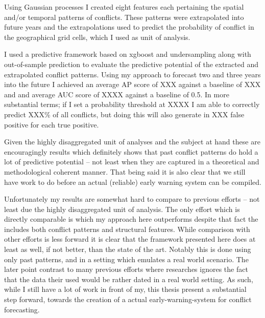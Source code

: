 \documentclass[a4paper]{article}
\begin{document}
Using Gaussian processes I created eight features each pertaining the spatial and/or temporal patterns of conflicts. These patterns were extrapolated into future years and the extrapolations used to predict the probability of conflict in the geographical grid cells, which I used as unit of analysis.\par

I used a predictive framework based on xgboost and undersampling along with out-of-sample prediction to evaluate the predictive potential of the extracted and extrapolated conflict patterns. Using my approach to forecast two and three years into the future I achieved an average AP score of XXX against a baseline of XXX and and average AUC score of XXXX against a baseline of 0.5. In more substantial terms; if I set a probability threshold at XXXX I am able to correctly predict XXX\% of all conflicts, but doing this will also generate in XXX false positive for each true positive.\par 

Given the highly disaggregated unit of analyses and the subject at hand these are encouragingly results which definitely shows that past conflict patterns do hold a lot of predictive potential -- not least when they are captured in a theoretical and methodological coherent manner. That being said it is also clear that we still have work to do before an actual (reliable) early warning system can be compiled.\par 

Unfortunately my results are somewhat hard to compare to previous efforts -- not least due the highly disaggregated unit of analysis. The only effort which is directly comparable is \cite{Maase} which my approach here outperforms despite that fact the \cite{Maase} includes both conflict patterns and structural features. While comparison with other efforts is less forward it is clear that the framework presented here does at least as well, if not better, than the state of the art. Notably this is done using only past patterns, and in a setting which emulates a real world scenario. The later point contrast to many previous efforts where researches ignores the fact that the data their used would be rather dated in a real world setting. As such, while I still have a lot of work in front of my, this thesis present a substantial step forward, towards the creation of a actual early-warning-system for conflict forecasting.\par
\end{document}
